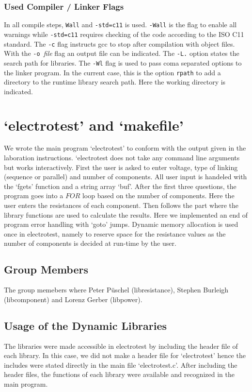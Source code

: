 \documentclass[a4paper,11pt,twoside]{article}
\begin{document}
\subsubsection{Used Compiler / Linker Flags}
In all compile steps, \verb+Wall+ and \verb+-std=c11+ is used. \verb+-Wall+ is the flag to enable all warnings while \verb+-std=c11+ requires checking of the code according to the ISO C11 standard. The \verb+-c+ flag instructs gcc to stop after compilation with object files. With the \verb+-o +\textit{file} flag an output file can be indicated. The \verb+-L.+ option states the search path for libraries. The \verb+-Wl+ flag is used to pass coma separated options to the linker program. In the current case, this is the option \verb+rpath+ to add a directory to the runtime library search path. Here the working directory is indicated.
   
\section{`electrotest' and `makefile'}
We wrote the main program `electrotest' to conform with the output given in the laboration instructions. `electrotest does not take any command line arguments but works interactively. First the user is asked to enter voltage, type of linking (sequence or parallel) and number of components. All user input is handeled with the `fgets' function and a string array `buf'. 
After the first three questions, the program goes into a $FOR$ loop based on the number of components. Here the user enters the resistances of each component. Then follows the part where the library functions are used to calculate the results. Here we implemented an end of program error handling with `goto' jumps.
Dynamic memory allocation is used once in electrotest, namely to reserve space for the resistance values as the number of components is decided at run-time by the user.   

\subsection{Group Members}
The group memebers where Peter Püschel (libresistance), Stephen Burleigh (libcomponent)  and Lorenz Gerber (libpower). 

\subsection{Usage of the Dynamic Libraries}
The libraries were made accessible in electrotest by including the header file of each library. In this case, we did not make a header file for `electrotest' hence the includes were stated directly in the main file `electrotest.c'. After including the header files, the functions of each library were available and recognized in the main program.
\end{document}
